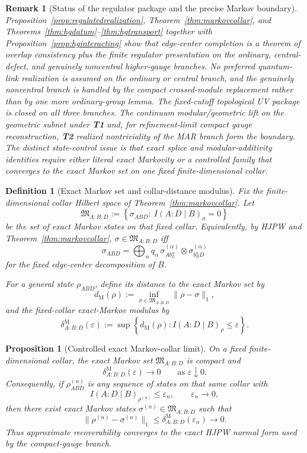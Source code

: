 \documentclass[11pt]{article}
\newtheorem{proposition}[theorem]{Proposition}
\newtheorem{definition}[theorem]{Definition}
\newtheorem{remark}[theorem]{Remark}
\begin{document}
\begin{remark}[Status of the regulator package and the precise Markov boundary]
Proposition~\ref{prop:regulatedrealization}, Theorem~\ref{thm:markovcollar}, and Theorems~\ref{thm:hgdatum}--\ref{thm:hgtransport} together with Proposition~\ref{prop:hginteracting} show that edge-center completion is a theorem of overlap consistency plus the finite regulator presentation on the ordinary, central-defect, and genuinely noncentral higher-gauge branches. No preferred quantum-link realization is assumed on the ordinary or central branch, and the genuinely noncentral branch is handled by the compact crossed-module replacement rather than by one more ordinary-group lemma. The fixed-cutoff topological UV package is closed on all three branches. The continuum modular/geometric lift on the geometric subnet under \textbf{T1} and, for refinement-limit compact gauge reconstruction, \textbf{T2} realized nontriviality of the MAR branch form the boundary. The distinct state-control issue is that exact splice and modular-additivity identities require either literal exact Markovity or a controlled family that converges to the exact Markov set on one fixed finite-dimensional collar.
\end{remark}

\begin{definition}[Exact Markov set and collar-distance modulus]\label{def:markovmodulus}
Fix the finite-dimensional collar Hilbert space of Theorem~\ref{thm:markovcollar}. Let
\[
\mathfrak M_{A:B:D}
:=
\left\{
\sigma_{ABD}:\ I(A:D\mid B)_\sigma=0
\right\}
\]
be the set of exact Markov states on that fixed collar. Equivalently, by HJPW and Theorem~\ref{thm:markovcollar}, \(\sigma\in\mathfrak M_{A:B:D}\) iff
\[
\sigma_{ABD}
=
\bigoplus_\alpha q_\alpha\,
\sigma^{(\alpha)}_{A b_L^\alpha}\otimes \sigma^{(\alpha)}_{b_R^\alpha D}
\]
for the fixed edge-center decomposition of \(B\).

For a general state \(\rho_{ABD}\), define its distance to the exact Markov set by
\[
d_{\mathrm M}(\rho):=\inf_{\sigma\in\mathfrak M_{A:B:D}}\|\rho-\sigma\|_1,
\]
and the fixed-collar exact-Markov modulus by
\[
\delta^{\mathrm M}_{A:B:D}(\varepsilon)
:=
\sup\left\{
d_{\mathrm M}(\rho):
I(A:D\mid B)_\rho\le \varepsilon
\right\}.
\]
\end{definition}

\begin{proposition}[Controlled exact Markov-collar limit]\label{prop:controlledmarkov}
On a fixed finite-dimensional collar, the exact Markov set \(\mathfrak M_{A:B:D}\) is compact and
\[
\delta^{\mathrm M}_{A:B:D}(\varepsilon)\longrightarrow 0
\qquad
\text{as }\varepsilon\downarrow 0.
\]
Consequently, if \(\rho^{(n)}_{ABD}\) is any sequence of states on that same collar with
\[
I(A:D\mid B)_{\rho^{(n)}}\le \varepsilon_n,
\qquad
\varepsilon_n\to0,
\]
then there exist exact Markov states \(\sigma^{(n)}\in\mathfrak M_{A:B:D}\) such that
\[
\|\rho^{(n)}-\sigma^{(n)}\|_1
\le
\delta^{\mathrm M}_{A:B:D}(\varepsilon_n)
\longrightarrow 0.
\]
Thus approximate recoverability converges to the exact HJPW normal form used by the compact-gauge branch.
\end{proposition}
\end{document}
